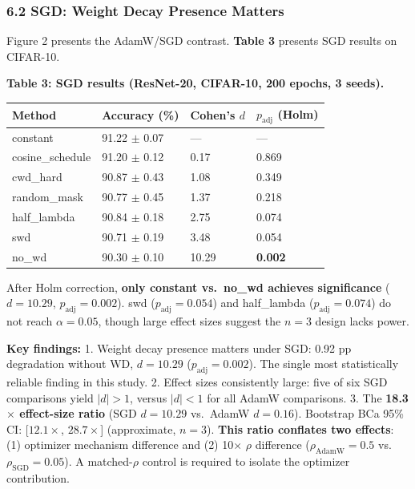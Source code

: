 \documentclass[
]{article}
\begin{document}
\hypertarget{sgd-weight-decay-presence-matters}{%
\subsubsection{6.2 SGD: Weight Decay Presence
Matters}\label{sgd-weight-decay-presence-matters}}

Figure 2 presents the AdamW/SGD contrast. \textbf{Table 3} presents SGD
results on CIFAR-10.

\textbf{Table 3: SGD results (ResNet-20, CIFAR-10, 200 epochs, 3
seeds).}

\begin{longtable}[]{@{}llll@{}}
\toprule\noalign{}
Method & Accuracy (\%) & Cohen's \(d\) & \(p_{\text{adj}}\) (Holm) \\
\midrule\noalign{}
\endhead
\bottomrule\noalign{}
\endlastfoot
constant & 91.22 \(\pm\) 0.07 & --- & --- \\
cosine\_schedule & 91.20 \(\pm\) 0.12 & 0.17 & 0.869 \\
cwd\_hard & 90.87 \(\pm\) 0.43 & 1.08 & 0.349 \\
random\_mask & 90.77 \(\pm\) 0.45 & 1.37 & 0.218 \\
half\_lambda & 90.84 \(\pm\) 0.18 & 2.75 & 0.074 \\
swd & 90.71 \(\pm\) 0.19 & 3.48 & 0.054 \\
no\_wd & 90.30 \(\pm\) 0.10 & 10.29 & \textbf{0.002} \\
\end{longtable}

After Holm correction, \textbf{only constant vs.~no\_wd achieves
significance} (\(d = 10.29\), \(p_{\text{adj}} = 0.002\)). swd
(\(p_{\text{adj}} = 0.054\)) and half\_lambda
(\(p_{\text{adj}} = 0.074\)) do not reach \(\alpha = 0.05\), though
large effect sizes suggest the \(n = 3\) design lacks power.

\textbf{Key findings:} 1. Weight decay presence matters under SGD: 0.92
pp degradation without WD, \(d = 10.29\) (\(p_{\text{adj}} = 0.002\)).
The single most statistically reliable finding in this study. 2. Effect
sizes consistently large: five of six SGD comparisons yield \(|d| > 1\),
versus \(|d| < 1\) for all AdamW comparisons. 3. The
\textbf{18.3\(\times\) effect-size ratio} (SGD \(d = 10.29\) vs.~AdamW
\(d = 0.16\)). Bootstrap BCa 95\% CI: {[}\(12.1\times\),
\(28.7\times\){]} (approximate, \(n = 3\)). \textbf{This ratio conflates
two effects}: (1) optimizer mechanism difference and (2) 10\(\times\)
\(\rho\) difference (\(\rho_{\text{AdamW}} = 0.5\)
vs.~\(\rho_{\text{SGD}} = 0.05\)). A matched-\(\rho\) control is
required to isolate the optimizer contribution.
\end{document}
